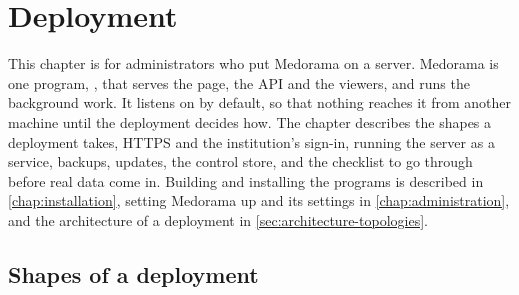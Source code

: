 \chapter{Deployment}
\label{chap:deployment}

This chapter is for administrators who put Medorama on a server. Medorama is one program,
, that serves the page, the API and the viewers, and runs the background
work. It listens on  by default, so that nothing reaches it from another
machine until the deployment decides how. The chapter describes the shapes a deployment takes,
HTTPS and the institution's sign-in, running the server as a service, backups, updates, the
control store, and the checklist to go through before real data come in. Building and installing
the programs is described in \cref{chap:installation}, setting Medorama up and its settings in
\cref{chap:administration}, and the architecture of a deployment in
\cref{sec:architecture-topologies}.

\section{Shapes of a deployment}
\label{sec:deployment-shapes}


